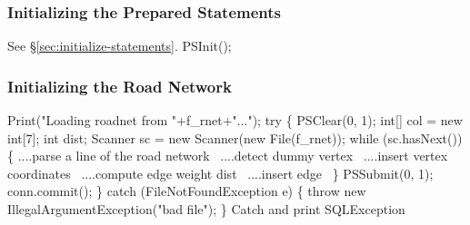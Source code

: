 \documentclass{article}
\def\nwendcode{\endtrivlist \endgroup}
\let\nwdocspar=\par
\theoremstyle{definition}
\begin{document}
\subsubsection{Initializing the Prepared Statements}
\label{sec:initializing-the-prepared-statements}
See \S\ref{sec:initialize-statements}.
\nwenddocs{}\endmoddef{}
PSInit();
\nwendcode{}\nwdocspar
\subsubsection{Initializing the Road Network}
\label{sec:initializing-the-road-network}
\nwenddocs{}\endmoddef{}
Print("Loading roadnet from "+f_rnet+"...");
try \{
  PSClear(0, 1);
  int[] col = new int[7];
  int dist;
  Scanner sc = new Scanner(new File(f_rnet));
  while (sc.hasNext()) \{
    \LA{}....parse a line of the road network~{\nwtagstyle{}}\RA{}
    \LA{}....detect dummy vertex~{\nwtagstyle{}}\RA{}
    \LA{}....insert vertex coordinates~{\nwtagstyle{}}\RA{}
    \LA{}....compute edge weight \code{}dist\edoc{}~{\nwtagstyle{}}\RA{}
    \LA{}....insert edge~{\nwtagstyle{}}\RA{}
  \}
  PSSubmit(0, 1);
  conn.commit();
\} catch (FileNotFoundException e) \{
  throw new IllegalArgumentException("bad file");
\}
\LA{}Catch and print \code{}SQLException\edoc{}~{\nwtagstyle{}}\RA{}
\nwendcode{}\nwdocspar
\end{document}
